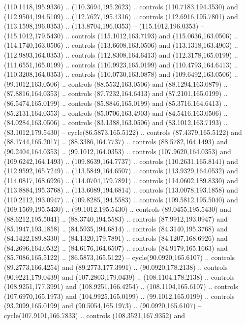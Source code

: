 \begin{scope}[cm={{1.25,0.0,0.0,-1.25,(0.0,442.91375)}}]
    (110.1118,195.9336) .. (110.3694,195.2623) .. controls (110.7183,194.3530) and
    (112.9504,194.5109) .. (112.7627,195.4316) .. controls (112.6916,195.7801) and
    (113.1598,196.0353) .. (113.8704,196.0353) -- (115.1012,196.0353) --
    (115.1012,179.5430) .. controls (115.1012,163.7193) and (115.0636,163.0506) ..
    (114.1740,163.0506) .. controls (113.6608,163.0506) and (113.1318,163.4903) ..
    (112.9893,164.0353) .. controls (112.8308,164.6413) and (112.3178,165.0199) ..
    (111.6551,165.0199) .. controls (110.9923,165.0199) and (110.4793,164.6413) ..
    (110.3208,164.0353) .. controls (110.0730,163.0878) and (109.6492,163.0506) ..
    (99.1012,163.0506) .. controls (88.5532,163.0506) and (88.1294,163.0879) ..
    (87.8816,164.0353) .. controls (87.7232,164.6413) and (87.2101,165.0199) ..
    (86.5474,165.0199) .. controls (85.8846,165.0199) and (85.3716,164.6413) ..
    (85.2131,164.0353) .. controls (85.0706,163.4903) and (84.5416,163.0506) ..
    (84.0284,163.0506) .. controls (83.1388,163.0506) and (83.1012,163.7193) ..
    (83.1012,179.5430) -- cycle(86.5873,165.5122) .. controls (87.4379,165.5122)
    and (88.1744,165.2017) .. (88.3386,164.7737) .. controls (88.5782,164.1493)
    and (90.2404,164.0353) .. (99.1012,164.0353) .. controls (107.9620,164.0353)
    and (109.6242,164.1493) .. (109.8639,164.7737) .. controls (110.2631,165.8141)
    and (112.9592,165.7249) .. (113.5849,164.6507) .. controls (113.9329,164.0532)
    and (114.0817,168.6926) .. (114.0704,179.7891) .. controls (114.0602,189.8330)
    and (113.8884,195.3768) .. (113.6089,194.6814) .. controls (113.0078,193.1858)
    and (110.2112,193.0947) .. (109.8285,194.5583) .. controls (109.5812,195.5040)
    and (109.1569,195.5430) .. (99.1012,195.5430) .. controls (89.0455,195.5430)
    and (88.6212,195.5041) .. (88.3740,194.5583) .. controls (87.9912,193.0947)
    and (85.1947,193.1858) .. (84.5935,194.6814) .. controls (84.3140,195.3768)
    and (84.1422,189.8330) .. (84.1320,179.7891) .. controls (84.1207,168.6926)
    and (84.2696,164.0532) .. (84.6176,164.6507) .. controls (84.9179,165.1663)
    and (85.7086,165.5122) .. (86.5873,165.5122) -- cycle(90.0920,165.6107) ..
    controls (89.2773,166.4254) and (89.2773,177.3991) .. (90.0920,178.2138) ..
    controls (90.9221,179.0439) and (107.2803,179.0439) .. (108.1104,178.2138) ..
    controls (108.9251,177.3991) and (108.9251,166.4254) .. (108.1104,165.6107) ..
    controls (107.6970,165.1973) and (104.9925,165.0199) .. (99.1012,165.0199) ..
    controls (93.2099,165.0199) and (90.5054,165.1973) .. (90.0920,165.6107) --
    cycle(107.9101,166.7833) .. controls (108.3521,167.9352) and

\end{scope}
